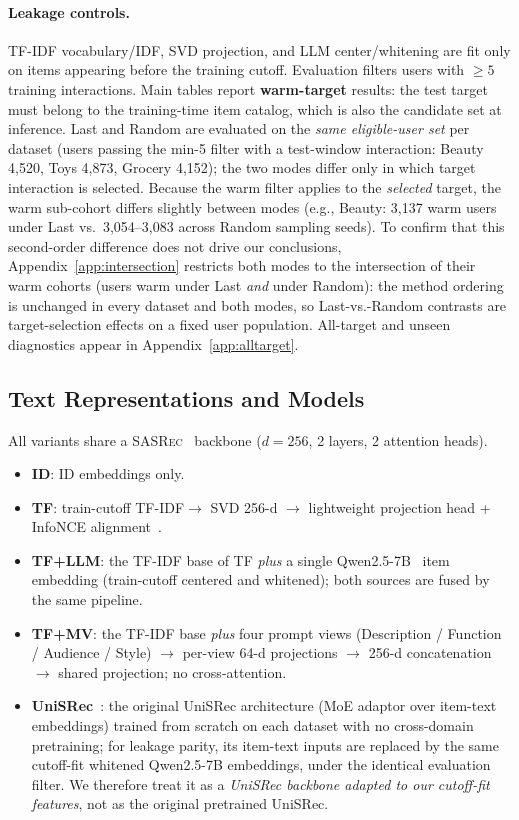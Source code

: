 \documentclass[sigconf,natbib=true,anonymous]{acmart}
\newcommand{\tfidf}{\textsc{TF-IDF}\xspace}
\newcommand{\tfllm}{\textsc{TF+LLM}\xspace}
\newcommand{\tfmv}{\textsc{TF+MV}\xspace}
\newcommand{\base}{\textsc{SASRec}\xspace}
\begin{document}
\paragraph{Leakage controls.}
\tfidf vocabulary/IDF, SVD projection, and LLM center/whitening are fit only on items appearing before the training cutoff.
Evaluation filters users with $\ge 5$ training interactions.
Main tables report \textbf{warm-target} results: the test target must belong to the training-time item catalog, which is also the candidate set at inference.
Last and Random are evaluated on the \emph{same eligible-user set} per dataset (users passing the min-5 filter with a test-window interaction: Beauty 4{,}520, Toys 4{,}873, Grocery 4{,}152); the two modes differ only in which target interaction is selected.
Because the warm filter applies to the \emph{selected} target, the warm sub-cohort differs slightly between modes (e.g., Beauty: 3{,}137 warm users under Last vs.\ 3{,}054--3{,}083 across Random sampling seeds).
To confirm that this second-order difference does not drive our conclusions, Appendix~\ref{app:intersection} restricts both modes to the intersection of their warm cohorts (users warm under Last \emph{and} under Random): the method ordering is unchanged in every dataset and both modes, so Last-vs.-Random contrasts are target-selection effects on a fixed user population.
All-target and unseen diagnostics appear in Appendix~\ref{app:alltarget}.

\subsection{Text Representations and Models}
\label{sec:models}

All variants share a \base~\cite{kang2018sasrec} backbone ($d{=}256$, 2 layers, 2 attention heads).

\begin{itemize}[leftmargin=*,itemsep=1pt]
\item \textbf{ID}: ID embeddings only.
\item \textbf{TF}: train-cutoff \tfidf $\to$ SVD 256-d $\to$ lightweight projection head + InfoNCE alignment~\cite{oord2018cpc}.
\item \textbf{\tfllm}: the \tfidf base of TF \emph{plus} a single Qwen2.5-7B~\cite{qwen2024qwen25} item embedding (train-cutoff centered and whitened); both sources are fused by the same pipeline.
\item \textbf{\tfmv}: the \tfidf base \emph{plus} four prompt views (Description / Function / Audience / Style) $\to$ per-view 64-d projections $\to$ 256-d concatenation $\to$ shared projection; no cross-attention.
\item \textbf{UniSRec}~\cite{hou2022unisrec}: the original UniSRec architecture (MoE adaptor over item-text embeddings) trained from scratch on each dataset with no cross-domain pretraining; for leakage parity, its item-text inputs are replaced by the same cutoff-fit whitened Qwen2.5-7B embeddings, under the identical evaluation filter.  We therefore treat it as a \emph{UniSRec backbone adapted to our cutoff-fit features}, not as the original pretrained UniSRec.
\end{itemize}
\end{document}
